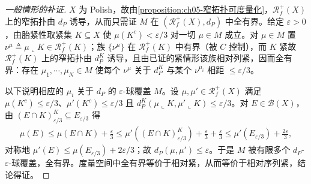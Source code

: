 \documentclass[../../main.tex]{subfiles}%
\begin{document}
\begin{proof}[一般情形的补证]
$X$ 为 Polish，故由\cref{proposition:ch05-窄拓扑可度量化}，$\mathscr{R}^+_f(X)$ 上的窄拓扑由 $d_P$ 诱导，从而只需证 $M$ 在 $({\mathscr{R}^+_f}(X),d_P)$ 中全有界。给定 $\varepsilon>0$，由胎紧性取紧集 $K\subseteq X$ 使 $\mu(K^c)<\varepsilon/3$ 对一切 $\mu\in M$ 成立。对 $\mu\in M$ 置 $\nu^\mu\triangleq\mu\llcorner K\in\mathscr{R}^+_f(K)$；族 $\{\nu^\mu\}$ 在 $\mathscr{R}^+_f(K)$ 中有界（被 $C$ 控制），而 $K$ 紧故 $\mathscr{R}^+_f(K)$ 上的窄拓扑由 $d_P^K$ 诱导，且由已证的紧情形该族相对列紧，因而全有界：存在 $\mu_1,\cdots ,\mu_N\in M$ 使每个 $\nu^\mu$ 关于 $d_P^K$ 与某个 $\nu^{\mu_i}$ 相距 $\leqslant\varepsilon/3$。

以下说明相应的 $\mu_i$ 关于 $d_P$ 的 $\varepsilon$-球覆盖 $M$。设 $\mu,\mu'\in\mathscr{R}^+_f(X)$ 满足 $\mu(K^c)\leqslant\varepsilon/3$、$\mu'(K^c)\leqslant\varepsilon/3$ 且 $d_P^K(\mu\llcorner K,\mu'\llcorner K)\leqslant\varepsilon/3$。对 $E\in\mathscr{B}(X)$，由 $(E\cap K)^K_{\varepsilon/3}\subseteq E_{\varepsilon/3}$ 得
\begin{align*}
\mu(E)\leqslant\mu(E\cap K)+\frac{\varepsilon}{3}
\leqslant\mu'((E\cap K)^K_{\varepsilon/3})+\frac{\varepsilon}{3}+\frac{\varepsilon}{3}
\leqslant\mu'(E_{\varepsilon/3})+\frac{2\varepsilon}{3},
\end{align*}
对称地 $\mu'(E)\leqslant\mu(E_{\varepsilon/3})+2\varepsilon/3$；故 $d_P(\mu,\mu')\leqslant\varepsilon$。于是 $M$ 被有限多个 $d_P$-$\varepsilon$-球覆盖，全有界。度量空间中全有界等价于相对紧，从而等价于相对序列紧，结论得证。
\end{proof}
\end{document}
